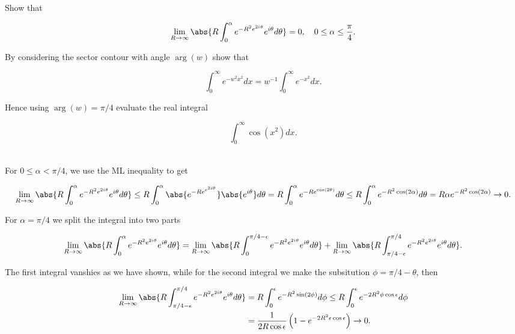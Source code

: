 \documentclass[english,a4paper,12pt]{report}
\begin{document}
{Show that 

\begin{equation}
    \lim_{R \to \infty} \abs{R \int_{0}^{\alpha } e^{-R^2e^{2i \theta } } e^{i \theta } d \theta }=0, \quad 0 \le \alpha \le \frac{\pi }{4}. 
\end{equation}

By considering the sector contour with angle \(\arg (w)\) show that 

\begin{equation}
    \int_{0}^{\infty} e^{-w^2x^2}dx = w^{-1} \int_{0}^{\infty} e^{-x^2} dx.    
\end{equation}

Hence using \(\arg (w) = \pi /4\) evaluate the real integral 

\begin{equation}
    \int_{0}^{\infty} \cos (x^2)dx.  
\end{equation}
~
}
{For \(0 \le \alpha < \pi /4\), we use the ML inequality to get 

\begin{equation}
     \lim_{R \to \infty} \abs{R \int_{0}^{\alpha } e^{-R^2e^{2i \theta } } e^{i \theta } d \theta } \le R \int_{0}^{\alpha } \abs{e^{-Re^{e^{2i \theta } } } } \abs{e^{i \theta } } d \theta = R \int_{0}^{\alpha } e^{-Re^{ \cos (2 \theta )} }  d \theta \le R \int_{0}^{\alpha }e^{-R^2\cos (2 \alpha )} d \theta = R \alpha e^{-R^2\cos (2\alpha )} \to 0.      
\end{equation}

For \(\alpha  = \pi /4\) we split the integral into two parts 

\begin{equation}
     \lim_{R \to \infty} \abs{R \int_{0}^{\alpha } e^{-R^2e^{2i \theta } } e^{i \theta } d \theta }  = \lim_{R \to \infty} \abs{R \int_{0}^{\pi /4 - \epsilon } e^{-R^2e^{2i \theta } } e^{i \theta } d \theta } +  \lim_{R \to \infty} \abs{R \int_{\pi / 4 - \epsilon }^{\pi /4} e^{-R^2e^{2i \theta } } e^{i \theta } d \theta }.
\end{equation}

The first integral vanshies as we have shown, while for the second integral we make the subsitution \(\phi = \pi /4 - \theta \), then 

\begin{equation}
    \begin{aligned} 
    \lim_{R \to \infty} \abs{R \int_{\pi / 4 - \epsilon }^{\pi /4} e^{-R^2e^{2i \theta } } e^{i \theta } d \theta } &= R \int_{0}^{\epsilon } e^{-R^2 \sin (2 \phi )}d\phi \le R \int_{0}^{\epsilon } e^{-2R^2\phi \cos \epsilon } d \phi \\
    &= \frac{1}{2R\cos \epsilon }\left( 1-e^{-2R^2\epsilon \cos \epsilon }  \right) \to 0.
    \end{aligned} 
\end{equation}
~
} 
\end{document}
